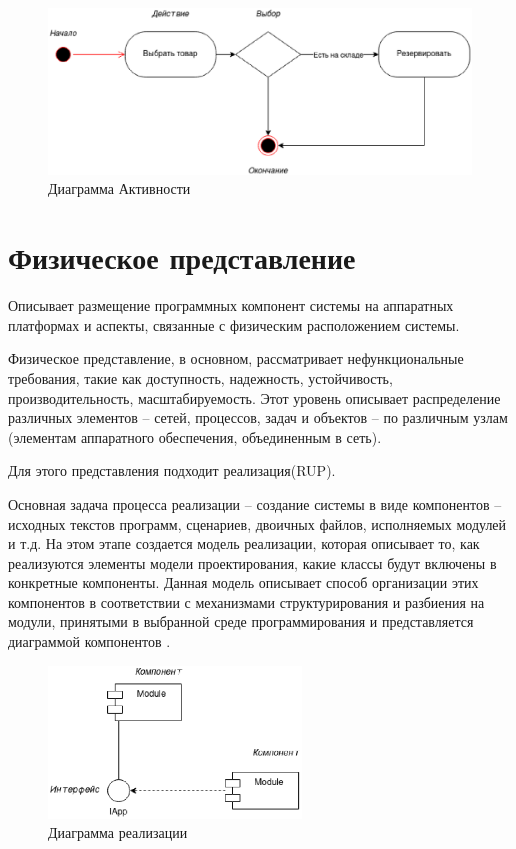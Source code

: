 \begin{figure}[h!]
        \centering
        \includegraphics[width=\textwidth]{images/4/2.eps}
        \caption{Диаграмма Активности}
        \label{uml}
\end{figure}
\section{Физическое представление}
Описывает размещение программных компонент системы на аппаратных платформах и аспекты, связанные с физическим расположением системы.

Физическое представление, в основном, рассматривает нефункциональные требования, такие как доступность, надежность, устойчивость, производительность, масштабируемость. Этот уровень описывает распределение различных элементов – сетей, процессов, задач и объектов – по различным узлам (элементам аппаратного обеспечения, объединенным в сеть).

Для этого представления подходит реализация(RUP).

Основная задача процесса реализации – создание системы в виде компонентов – исходных текстов программ, сценариев, двоичных файлов, исполняемых модулей и т.д. На этом этапе создается модель реализации, которая описывает то, как реализуются элементы модели проектирования, какие классы будут включены в конкретные компоненты. Данная модель описывает способ организации этих компонентов в соответствии с механизмами структурирования и разбиения на модули, принятыми в выбранной среде программирования и представляется диаграммой компонентов .
\begin{figure}[h!]
        \centering
        \includegraphics[width=0.6\textwidth]{images/4/3.eps}
        \caption{Диаграмма реализации}
        \label{uml}
\end{figure}

